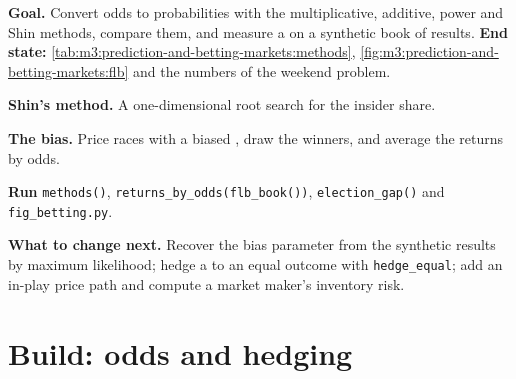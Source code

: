 \begin{tutorial}
\textbf{Goal.} Convert  odds to probabilities with the multiplicative, additive, power and Shin methods, compare them, and measure a
 on a synthetic book of results. \textbf{End state:} \cref{tab:m3:prediction-and-betting-markets:methods},
\cref{fig:m3:prediction-and-betting-markets:flb} and the numbers of the weekend problem.
\begin{tutsteps}
\item \textbf{Shin's method.} A one-dimensional root search for the insider share.
\label{lst:m3:prediction-and-betting-markets:shin}
\item \textbf{The bias.} Price races with a biased , draw the winners, and average the returns by odds.
\label{lst:m3:prediction-and-betting-markets:flb}
\item \textbf{Run} \texttt{methods()}, \texttt{returns\_by\_odds(flb\_book())}, \texttt{election\_gap()} and \texttt{fig\_betting.py}.
\end{tutsteps}
\textbf{What to change next.} Recover the bias parameter from the synthetic results by maximum likelihood; hedge a  to an equal outcome with
\texttt{hedge\_equal}; add an in-play price path and compute a market maker's inventory risk.
\end{tutorial}

\section{Build: odds and hedging}\label{bld:m3:prediction-and-betting-markets:odds}

